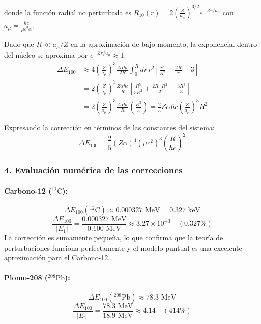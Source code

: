 \begin{problema}
donde la función radial no perturbada es $R_{10}(r) = 2 \left(\frac{Z}{a_\mu}\right)^{3/2} e^{-Z r / a_\mu}$ con $a_\mu = \frac{\hbar c}{\mu c^2 \alpha}$.

Dado que $R \ll a_\mu / Z$ en la aproximación de bajo momento, la exponencial dentro del núcleo se aproxima por $e^{-Z r / a_\mu} \approx 1$:
\begin{align}
\Delta E_{100} &\approx 4 \left( \frac{Z}{a_\mu} \right)^3 \frac{Z \alpha \hbar c}{2 R} \int_0^R dr \, r^2 \left[ \frac{r^2}{R^2} + \frac{2 R}{r} - 3 \right] \nonumber \\
&= 2 \left( \frac{Z}{a_\mu} \right)^3 \frac{Z \alpha \hbar c}{R} \left[ \frac{R^5}{5 R^2} + \frac{2 R \cdot R^2}{2} - \frac{3 R^3}{3} \right] \nonumber \\
&= 2 \left( \frac{Z}{a_\mu} \right)^3 \frac{Z \alpha \hbar c}{R} \left( \frac{R^3}{5} \right) = \frac{2}{5} Z \alpha \hbar c \left( \frac{Z}{a_\mu} \right)^3 R^2
\end{align}

Expresando la corrección en términos de las constantes del sistema:
\begin{equation*}
\Delta E_{100} = \frac{2}{5} (Z \alpha)^4 (\mu c^2)^3 \left( \frac{R}{\hbar c} \right)^2
\end{equation*}

\subsubsection*{4. Evaluación numérica de las correcciones}

\paragraph{Carbono-12 (${}^{12}\text{C}$):}
\begin{equation*}
\Delta E_{100}({}^{12}\text{C}) \approx 0.000327\text{ MeV} = 0.327\text{ keV}
\end{equation*}
\begin{equation*}
\frac{\Delta E_{100}}{|E_1|} = \frac{0.000327\text{ MeV}}{0.100\text{ MeV}} \approx 3.27 \times 10^{-3} \quad (0.327\%)
\end{equation*}
La corrección es sumamente pequeña, lo que confirma que la teoría de perturbaciones funciona perfectamente y el modelo puntual es una excelente aproximación para el Carbono-12.

\paragraph{Plomo-208 (${}^{208}\text{Pb}$):}
\begin{equation*}
\Delta E_{100}({}^{208}\text{Pb}) \approx 78.3\text{ MeV}
\end{equation*}
\begin{equation*}
\frac{\Delta E_{100}}{|E_1|} = \frac{78.3\text{ MeV}}{18.9\text{ MeV}} \approx 4.14 \quad (414\%)
\end{equation*}


\end{problema}
